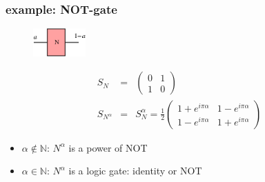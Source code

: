 \documentclass{beamer}
\begin{document}
\begin{frame}
	\frametitle{example: NOT-gate}
	\begin{figure}
		\centering
		\includegraphics[width=2cm]{fig/not.png}
	\end{figure}
	\begin{eqnarray}
		S_N&=&\begin{pmatrix}0&1\\1&0\end{pmatrix}\\
		S_{N^\alpha}&=&S_N^\alpha=\frac{1}{2}\begin{pmatrix}1+e^{i\pi\alpha}&1-e^{i\pi\alpha}\\1-e^{i\pi\alpha}&1+e^{i\pi\alpha}\end{pmatrix}
	\end{eqnarray}
	\begin{itemize}
		\item $\alpha\notin\mathbb{N}$: $N^\alpha$ is a power of NOT
		\item $\alpha\in\mathbb{N}$: $N^\alpha$ is a logic gate: identity or NOT
	\end{itemize}
\end{frame}
%
\end{document}
